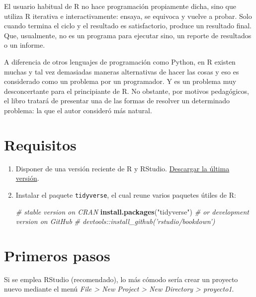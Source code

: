 \documentclass[
]{book}
\newenvironment{Shaded}{\begin{snugshade}}{\end{snugshade}}
\newcommand{\CommentTok}[1]{\textcolor[rgb]{0.56,0.35,0.01}{\textit{#1}}}
\newcommand{\KeywordTok}[1]{\textcolor[rgb]{0.13,0.29,0.53}{\textbf{#1}}}
\newcommand{\NormalTok}[1]{#1}
\newcommand{\StringTok}[1]{\textcolor[rgb]{0.31,0.60,0.02}{#1}}
\begin{document}
El usuario habitual de R no hace programación propiamente dicha, sino que utiliza R iterativa e interactivamente: ensaya, se equivoca y vuelve a probar. Solo cuando termina el ciclo y el resultado es satisfactorio, produce un resultado final. Que, usualmente, no es un programa para ejecutar sino, un reporte de resultados o un informe.

A diferencia de otros lenguajes de programación como Python, en R existen muchas y tal vez demasiadas maneras alternativas de hacer las cosas y eso es considerado como un problema por un programador. Y es un problema muy desconcertante para el principiante de R. No obstante, por motivos pedagógicos, el libro tratará de presentar una de las formas de resolver un determinado problema: la que el autor consideró más natural.

\hypertarget{requisitos}{%
\section{Requisitos}\label{requisitos}}

\begin{enumerate}
\def\labelenumi{\arabic{enumi}.}
\item
  Disponer de una versión reciente de R y RStudio. \href{https://www.rstudio.com/products/rstudio/download/}{Descargar la última versión}.
\item
  Instalar el paquete \texttt{tidyverse}, el cual reune varios paquetes útiles de R:

\begin{Shaded}
\begin{Highlighting}[]
\CommentTok{# stable version on CRAN}
\KeywordTok{install.packages}\NormalTok{(}\StringTok{"tidyverse"}\NormalTok{)}
\CommentTok{# or development version on GitHub}
\CommentTok{# devtools::install_github('rstudio/bookdown')}
\end{Highlighting}
\end{Shaded}
\end{enumerate}

\hypertarget{primeros-pasos}{%
\section{Primeros pasos}\label{primeros-pasos}}

Si se emplea RStudio (recomendado), lo más cómodo sería crear un proyecto nuevo
mediante el menú \emph{File \textgreater{} New Project \textgreater{} New Directory \textgreater{} proyecto1}.
\end{document}
